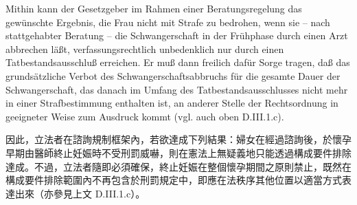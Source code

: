\documentclass[12pt]{article}
\begin{document}
\begin{sourcepara}[title={原文D.102}]
Mithin kann der Gesetzgeber im Rahmen einer Beratungsregelung das gewünschte Ergebnis, die Frau nicht mit Strafe zu bedrohen, wenn sie -- nach stattgehabter Beratung -- die Schwangerschaft in der Frühphase durch einen Arzt abbrechen läßt, verfassungsrechtlich unbedenklich nur durch einen Tatbestandsausschluß erreichen. Er muß dann freilich dafür Sorge tragen, daß das grundsätzliche Verbot des Schwangerschaftsabbruchs für die gesamte Dauer der Schwangerschaft, das danach im Umfang des Tatbestandsausschlusses nicht mehr in einer Strafbestimmung enthalten ist, an anderer Stelle der Rechtsordnung in geeigneter Weise zum Ausdruck kommt (vgl. auch oben D.III.1.c).
\end{sourcepara}
\begin{transpara}
因此，立法者在諮詢規制框架內，若欲達成下列結果：婦女在經過諮詢後，於懷孕早期由醫師終止妊娠時不受刑罰威嚇，則在憲法上無疑義地只能透過構成要件排除達成。不過，立法者隨即必須確保，終止妊娠在整個懷孕期間之原則禁止，既然在構成要件排除範圍內不再包含於刑罰規定中，即應在法秩序其他位置以適當方式表達出來（亦參見上文 D.III.1.c）。
\end{transpara}
\end{document}
